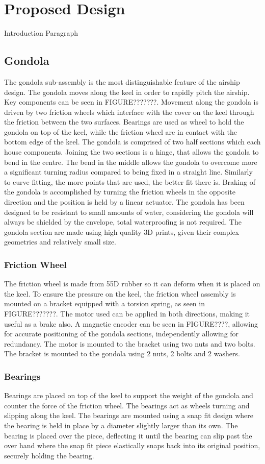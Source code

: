 \documentclass[../main.tex]{subfiles}
\begin{document}
\chapter{Proposed Design}
Introduction Paragraph
\section{Gondola}
The gondola sub-assembly is the most distinguishable feature of the airship design. The gondola moves along the keel in order to rapidly pitch the airship. Key components can be seen in FIGURE???????. Movement along the gondola is driven by two friction wheels which interface with the cover on the keel through the friction between the two surfaces. Bearings are used as wheel to hold the gondola on top of the keel, while the friction wheel are in contact with the bottom edge of the keel. The gondola is comprised of two half sections which each house components. Joining the two sections is a hinge, that allows the gondola to bend in the centre. The bend in the middle allows the gondola to overcome more a significant turning radius compared to being fixed in a straight line. Similarly to curve fitting, the more points that are used, the better fit there is. Braking of the gondola is accomplished by turning the friction wheels in the opposite direction and the position is held by a linear actuator. The gondola has been designed to be resistant to small amounts of water, considering the gondola will always be shielded by the envelope, total waterproofing is not required. The gondola section are made using high quality 3D prints, given their complex geometries and relatively small size.
\\
\subsection{Friction Wheel}
The friction wheel is made from 55D rubber so it can deform when it is placed on the keel. To ensure the pressure on the keel, the friction wheel assembly is mounted on a bracket equipped with a torsion spring, as seen in FIGURE???????. The motor used can be applied in both directions, making it useful as a brake also. A magnetic encoder can be seen in FIGURE????, allowing for accurate positioning of the gondola sections, independently allowing for redundancy. The motor is mounted to the bracket using two nuts and two bolts. The bracket is mounted to the gondola using 2 nuts, 2 bolts and 2 washers.
\\
\subsection{Bearings}
Bearings are placed on top of the keel to support the weight of the gondola and counter the force of the friction wheel. The bearings act as wheels turning and slipping along the keel. The bearings are mounted using a snap fit design where the bearing is held in place by a diameter slightly larger than its own. The bearing is placed over the piece, deflecting it until the bearing can slip past the over hand where the snap fit piece elastically snaps back into its original position, securely holding the bearing.
\\
\end{document}
